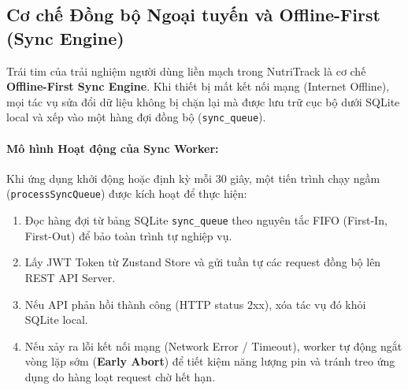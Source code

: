 \documentclass[12pt,a4paper]{article}
\begin{document}
\subsection{Cơ chế Đồng bộ Ngoại tuyến và Offline-First (Sync Engine)}

Trái tim của trải nghiệm người dùng liền mạch trong NutriTrack là cơ chế \textbf{Offline-First Sync Engine}. Khi thiết bị mất kết nối mạng (Internet Offline), mọi tác vụ sửa đổi dữ liệu không bị chặn lại mà được lưu trữ cục bộ dưới SQLite local và xếp vào một hàng đợi đồng bộ (\texttt{sync\_queue}).

\paragraph{Mô hình Hoạt động của Sync Worker:}
Khi ứng dụng khởi động hoặc định kỳ mỗi 30 giây, một tiến trình chạy ngầm (\texttt{processSyncQueue}) được kích hoạt để thực hiện:
\begin{enumerate}
    \item Đọc hàng đợi từ bảng SQLite \texttt{sync\_queue} theo nguyên tắc FIFO (First-In, First-Out) để bảo toàn trình tự nghiệp vụ.
    \item Lấy JWT Token từ Zustand Store và gửi tuần tự các request đồng bộ lên REST API Server.
    \item Nếu API phản hồi thành công (HTTP status 2xx), xóa tác vụ đó khỏi SQLite local.
    \item Nếu xảy ra lỗi kết nối mạng (Network Error / Timeout), worker tự động ngắt vòng lặp sớm (\textbf{Early Abort}) để tiết kiệm năng lượng pin và tránh treo ứng dụng do hàng loạt request chờ hết hạn.
\end{enumerate}
\end{document}

